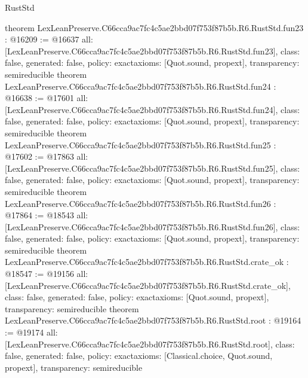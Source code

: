 \begin{lexlean}{RustStd}
\begin{coremodule}
{}
theorem LexLeanPreserve.C66cca9ac7fc4c5ae2bbd07f753f87b5b.R6.RustStd.fun23 : @16209 := @16637 {
  all: [LexLeanPreserve.C66cca9ac7fc4c5ae2bbd07f753f87b5b.R6.RustStd.fun23],
  class: false,
  generated: false,
  policy: exact{axioms: [Quot.sound, propext]},
  transparency: semireducible
}
theorem LexLeanPreserve.C66cca9ac7fc4c5ae2bbd07f753f87b5b.R6.RustStd.fun24 : @16638 := @17601 {
  all: [LexLeanPreserve.C66cca9ac7fc4c5ae2bbd07f753f87b5b.R6.RustStd.fun24],
  class: false,
  generated: false,
  policy: exact{axioms: [Quot.sound, propext]},
  transparency: semireducible
}
theorem LexLeanPreserve.C66cca9ac7fc4c5ae2bbd07f753f87b5b.R6.RustStd.fun25 : @17602 := @17863 {
  all: [LexLeanPreserve.C66cca9ac7fc4c5ae2bbd07f753f87b5b.R6.RustStd.fun25],
  class: false,
  generated: false,
  policy: exact{axioms: [Quot.sound, propext]},
  transparency: semireducible
}
theorem LexLeanPreserve.C66cca9ac7fc4c5ae2bbd07f753f87b5b.R6.RustStd.fun26 : @17864 := @18543 {
  all: [LexLeanPreserve.C66cca9ac7fc4c5ae2bbd07f753f87b5b.R6.RustStd.fun26],
  class: false,
  generated: false,
  policy: exact{axioms: [Quot.sound, propext]},
  transparency: semireducible
}
theorem LexLeanPreserve.C66cca9ac7fc4c5ae2bbd07f753f87b5b.R6.RustStd.crate_ok : @18547 := @19156 {
  all: [LexLeanPreserve.C66cca9ac7fc4c5ae2bbd07f753f87b5b.R6.RustStd.crate_ok],
  class: false,
  generated: false,
  policy: exact{axioms: [Quot.sound, propext]},
  transparency: semireducible
}
theorem LexLeanPreserve.C66cca9ac7fc4c5ae2bbd07f753f87b5b.R6.RustStd.root : @19164 := @19174 {
  all: [LexLeanPreserve.C66cca9ac7fc4c5ae2bbd07f753f87b5b.R6.RustStd.root],
  class: false,
  generated: false,
  policy: exact{axioms: [Classical.choice, Quot.sound, propext]},
  transparency: semireducible
}


\end{coremodule}
\end{lexlean}
